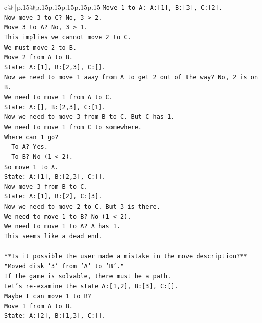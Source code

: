\documentclass{article}
\begin{document}
{\begin{supertabular}{c@{$\;$}|p{.15\linewidth}@{}p{.15\linewidth}p{.15\linewidth}p{.15\linewidth}p{.15\linewidth}p{.15\linewidth}}
{{{\texttt{Move 1 to A: A:{[}1{]}, B:{[}3{]}, C:{[}2{]}.} \\
\texttt{Now move 3 to C? No, 3 > 2.} \\
\texttt{Move 3 to A? No, 3 > 1.} \\
\texttt{This implies we cannot move 2 to C.} \\
\texttt{We must move 2 to B.} \\
\texttt{Move 2 from A to B.} \\
\texttt{State: A:{[}1{]}, B:{[}2,3{]}, C:{[}{]}.} \\
\texttt{Now we need to move 1 away from A to get 2 out of the way? No, 2 is on B.} \\
\texttt{We need to move 1 from A to C.} \\
\texttt{State: A:{[}{]}, B:{[}2,3{]}, C:{[}1{]}.} \\
\texttt{Now we need to move 3 from B to C. But C has 1.} \\
\texttt{We need to move 1 from C to somewhere.} \\
\texttt{Where can 1 go?} \\
\texttt{{-} To A? Yes.} \\
\texttt{{-} To B? No (1 < 2).} \\
\texttt{So move 1 to A.} \\
\texttt{State: A:{[}1{]}, B:{[}2,3{]}, C:{[}{]}.} \\
\texttt{Now move 3 from B to C.} \\
\texttt{State: A:{[}1{]}, B:{[}2{]}, C:{[}3{]}.} \\
\texttt{Now we need to move 2 to C. But 3 is there.} \\
\texttt{We need to move 1 to B? No (1 < 2).} \\
\texttt{We need to move 1 to A? A has 1.} \\
\texttt{This seems like a dead end.} \\
\\ 
\texttt{**Is it possible the user made a mistake in the move description?**} \\
\texttt{"Moved disk '3' from 'A' to 'B'."} \\
\texttt{If the game is solvable, there must be a path.} \\
\texttt{Let's re{-}examine the state A:{[}1,2{]}, B:{[}3{]}, C:{[}{]}.} \\
\texttt{Maybe I can move 1 to B?} \\
\texttt{Move 1 from A to B.} \\
\texttt{State: A:{[}2{]}, B:{[}1,3{]}, C:{[}{]}.} \\
}}}
\end{supertabular}}
\end{document}
